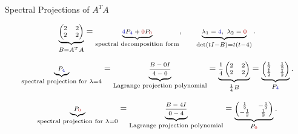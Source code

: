 \documentclass[10pt]{beamer}
\theoremstyle{definition}
\newcommand{\rd}[1]{{\color{red!70!black}#1}}
\newcommand{\bl}[1]{{\color{blue!70!black}#1}}
\begin{document}
\begin{frame}[shrink=10]{Spectral Projections of $A^TA$}

\[
\scriptsize
\underbrace{
\begin{pmatrix}
2&2\\
2&2
\end{pmatrix}}_{B=A^TA}
=
\underbrace{
\bl{4}P_{\bl{4}}+\rd{0}P_{\rd{0}}}_{\text{spectral decomposition form}},
\qquad
\underbrace{\lambda_1=\bl{4},\ \lambda_2=\rd{0}}_{\det(tI-B)=t(t-4)}.
\]

\vfill

\[
\scriptsize
\underbrace{P_{\bl{4}}}_{\text{spectral projection for }\lambda=4}
=
\underbrace{\frac{B-0I}{4-0}}_{\text{Lagrange projection polynomial}}
=
\underbrace{\frac14
\begin{pmatrix}
2&2\\
2&2
\end{pmatrix}}_{\frac14B}
=
\underbrace{
\begin{pmatrix}
\frac12&\frac12\\
\frac12&\frac12
\end{pmatrix}}_{P_{\bl{4}}}.
\]

\vfill

\[
\scriptsize
\underbrace{P_{\rd{0}}}_{\text{spectral projection for }\lambda=0}
=
\underbrace{\frac{B-4I}{0-4}}_{\text{Lagrange projection polynomial}}
=
\underbrace{
\begin{pmatrix}
\frac12&-\frac12\\
-\frac12&\frac12
\end{pmatrix}}_{P_{\rd{0}}}.
\]

\end{frame}
\end{document}
